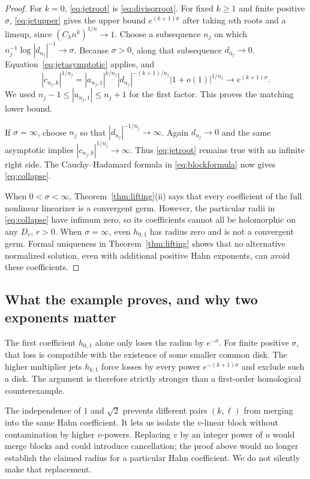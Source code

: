 \documentclass[11pt,a4paper]{article}
\numberwithin{equation}{section}
\theoremstyle{definition}
\theoremstyle{remark}
\begin{document}
\begin{proof}
For $k=0$, \eqref{eq:jetroot} is \eqref{eq:divisorroot}.
For fixed $k\ge1$ and finite positive $\sigma$,
\eqref{eq:jetupper} gives the upper bound $e^{(k+1)\sigma}$ after taking
$n$th roots and a limsup, since $(C_kn^k)^{1/n}\to1$.
Choose a subsequence $n_j$ on which
$n_j^{-1}\log|d_{n_j}|^{-1}\to\sigma$. Because $\sigma>0$, along that
subsequence $d_{n_j}\to0$. Equation~\eqref{eq:jetasymptotic} applies, and
\[
 |c_{n_j,k}|^{1/n_j}
 =|a_{n_j,1}|^{k/n_j}|d_{n_j}|^{-(k+1)/n_j}
   |1+o(1)|^{1/n_j}\longrightarrow e^{(k+1)\sigma}.
\]
We used $n_j-1\le|a_{n_j,1}|\le n_j+1$ for the first factor. This proves
the matching lower bound.

If $\sigma=\infty$, choose $n_j$ so that
$|d_{n_j}|^{-1/n_j}\to\infty$. Again $d_{n_j}\to0$ and the same
asymptotic implies $|c_{n_j,k}|^{1/n_j}\to\infty$. Thus
\eqref{eq:jetroot} remains true with an infinite right side.
The Cauchy--Hadamard formula in \eqref{eq:blockformula} now gives
\eqref{eq:collapse}.

When $0<\sigma<\infty$, Theorem~\ref{thm:lifting}(ii) says that every
coefficient of the full nonlinear linearizer is a convergent germ.
However, the particular radii in \eqref{eq:collapse} have infimum zero,
so its coefficients cannot all be holomorphic on any $D_r$, $r>0$.
When $\sigma=\infty$, even $h_{0,1}$ has radius zero and is not a
convergent germ. Formal uniqueness in Theorem~\ref{thm:lifting} shows
that no alternative normalized solution, even with additional positive
Hahn exponents, can avoid these coefficients.
\end{proof}

\subsection{What the example proves, and why two exponents matter}

The first coefficient $h_{0,1}$ alone only loses the radius by $e^{-\sigma}$.
For finite positive $\sigma$, that loss is compatible with the existence
of some smaller common disk. The higher multiplier jets $h_{k,1}$ force
losses by every power $e^{-(k+1)\sigma}$ and exclude such a disk. The
argument is therefore strictly stronger than a first-order homological
counterexample.

The independence of $1$ and $\sqrt2$ prevents different pairs $(k,\ell)$
from merging into the same Hahn coefficient. It lets us isolate the
$v$-linear block without contamination by higher $v$-powers. Replacing
$v$ by an integer power of $u$ would merge blocks and could introduce
cancellation; the proof above would no longer establish the claimed
radius for a particular Hahn coefficient. We do not silently make that
replacement.
\end{document}
